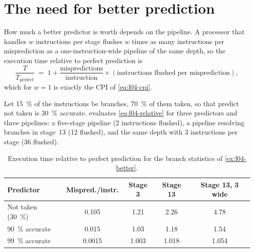 \documentclass[../main.tex]{subfiles}
\begin{document}
\section{The need for better prediction}
\label{sec:l04-better}

How much a better predictor is worth depends on the
pipeline.  A processor that
handles $w$ instructions per stage flushes $w$ times as many instructions per
misprediction as a one-instruction-wide pipeline of the same depth, so the
execution time relative to perfect prediction is
\begin{equation}
  \frac{T}{T_{\text{perfect}}} \;=\; 1 +
  \frac{\text{mispredictions}}{\text{instruction}} \times
  (\text{instructions flushed per misprediction}) ,
  \label{eq:l04-relative}
\end{equation}
which for $w=1$ is exactly the CPI of \cref{eq:l04-cpi}.

\begin{example}
  \label{ex:l04-better}
  Let \SI{15}{\percent} of the instructions be branches, \SI{70}{\percent} of
  them taken, so that predict not taken is \SI{30}{\percent} accurate.
   evaluates \cref{eq:l04-relative} for three
  predictors and three pipelines: a five-stage pipeline (2 instructions
  flushed), a pipeline resolving branches in stage~13 (12 flushed), and the
  same depth with 3 instructions per stage (36
  flushed).
\end{example}

\begin{table}[htbp]
  \centering\small
  \caption{Execution time relative to perfect prediction for the branch
    statistics of \cref{ex:l04-better}.}
  \label{tab:l04-better}
  \begin{tabular}{@{}lcccc@{}}
    \toprule
    Predictor & Mispred./instr. & Stage 3 & Stage 13 & Stage 13, 3 wide \\
    \midrule
    Not taken (\SI{30}{\percent}) & 0.105  & 1.21  & 2.26  & 4.78 \\
    \SI{90}{\percent} accurate    & 0.015  & 1.03  & 1.18  & 1.54 \\
    \SI{99}{\percent} accurate    & 0.0015 & 1.003 & 1.018 & 1.054 \\
    \bottomrule
  \end{tabular}
\end{table}
\end{document}

